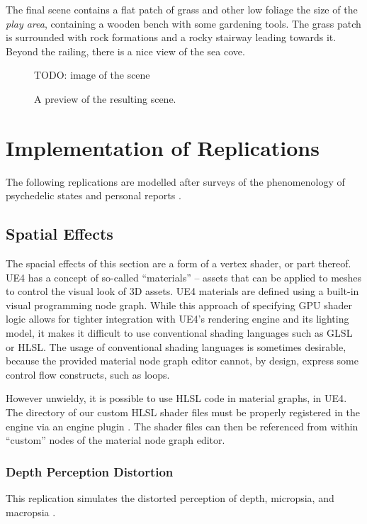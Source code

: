 The final scene contains a flat patch of grass and other low foliage the size of the \textit{play area}, containing a wooden bench with some gardening tools. The grass patch is surrounded with rock formations and a rocky stairway leading towards it. Beyond the railing, there is a nice view of the sea cove.

\begin{figure}[H]
    \centering
    \ifgraphics
        TODO: image of the scene
    \fi
    \caption{A preview of the resulting scene.}\label{fig:scene-preview}
\end{figure}

\section{Implementation of Replications}
The following replications are modelled after surveys of the phenomenology of psychedelic states \autocites{preller2016phenomenology}{kometer2016serotonergic} and personal reports \autocite{kleinman1977comparison}.

\subsection{Spatial Effects}
The spacial effects of this section are a form of a vertex shader, or part thereof. \ac{UE4} has a concept of so-called ``materials'' -- assets that can be applied to meshes to control the visual look of 3D assets. \ac{UE4} materials are defined using a built-in visual programming node graph. While this approach of specifying \ac{GPU} shader logic allows for tighter integration with \ac{UE4}'s rendering engine and its lighting model, it makes it difficult to use conventional shading languages such as \ac{GLSL} or \ac{HLSL}. The usage of conventional shading languages is sometimes desirable, because the provided material node graph editor cannot, by design, express some control flow constructs, such as loops.

However unwieldy, it is possible to use \ac{HLSL} code in material graphs, in \ac{UE4}. The directory of our custom \ac{HLSL} shader files must be properly registered in the engine via an engine plugin \autocite{synthenz2021shaderdir}. The shader files can then be referenced from within ``custom'' nodes of the material node graph editor.

\subsubsection{Depth Perception Distortion}
This replication simulates the distorted perception of depth, micropsia, and macropsia \autocites{fischer1970psilocybin}{dittrich1998standardized}{hill1969effects}{hill1973induction}.

